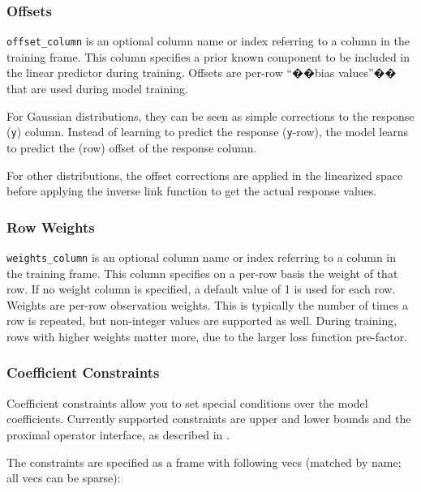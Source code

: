 \waterExampleInPython



\subsubsection{Offsets}

\texttt{offset\_column} is an optional column name or index referring to a column in the training frame. This column specifies a prior known component to be included in the linear predictor during training. Offsets are per-row ``��bias values''�� that are used during model training. 

For Gaussian distributions, they can be seen as simple corrections to the response (\texttt{y}) column. Instead of learning to predict the response (\texttt{y}-row), the model learns to predict the (row) offset of the response column. 

For other distributions, the offset corrections are applied in the linearized space before applying the inverse link function to get the actual response values.  

\subsubsection{Row Weights}
\texttt{weights\_column} is an optional column name or index referring to a column in the training frame. This column specifies on a per-row basis the weight of that row.  If no weight column is specified, a default value of 1 is used for each row. Weights are per-row observation weights. This is typically the number of times a row is repeated, but non-integer values are supported as well. During training, rows with higher weights matter more, due to the larger loss function pre-factor.

\subsubsection{Coefficient Constraints}
Coefficient constraints allow you to set special conditions over the model coefficients. Currently supported
constraints are upper and lower bounds and the proximal operator interface, as described in .

The constraints are specified as a frame with following vecs (matched by name; all vecs can be sparse):

